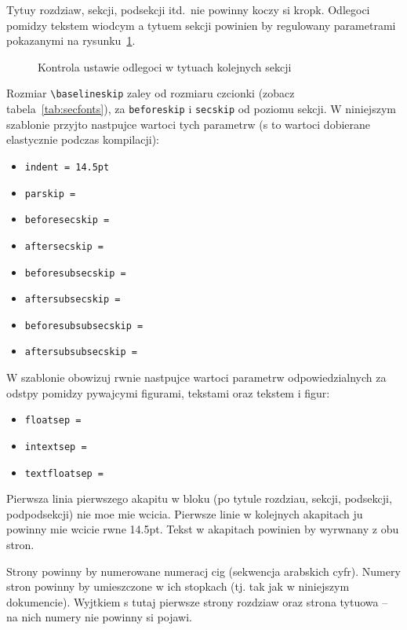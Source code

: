 Tytuy rozdziaw, sekcji, podsekcji itd.\ nie powinny koczy si kropk. Odlegoci pomidzy tekstem wiodcym a tytuem sekcji powinien by regulowany parametrami pokazanymi na rysunku~\ref{fig:LaySec}. 
\begin{figure}[t]
\runinheadfalse
\drawparameterstrue
\drawheading{\Large\bfseries}
\caption{Kontrola ustawie odlegoci w tytuach kolejnych sekcji} 
\label{fig:LaySec}
\end{figure}
Rozmiar \verb?\baselineskip? zaley od rozmiaru czcionki (zobacz tabela~\ref{tab:secfonts}), za \texttt{beforeskip} i \texttt{secskip} od poziomu sekcji. W niniejszym szablonie przyjto nastpujce wartoci tych parametrw (s to wartoci dobierane elastycznie podczas kompilacji):
\begin{itemize}
\item \texttt{indent = 14.5pt}
\item \texttt{parskip = \printlength{\parskip}}
\item \texttt{beforesecskip = \printlength{\beforesecskip}}
\item \texttt{aftersecskip = \printlength{\aftersecskip}}
\item \texttt{beforesubsecskip = \printlength{\beforesubsecskip}}
\item \texttt{aftersubsecskip = \printlength{\aftersubsecskip}}
\item \texttt{beforesubsubsecskip = \printlength{\beforesubsecskip}}
\item \texttt{aftersubsubsecskip = \printlength{\aftersubsecskip}}
\end{itemize}

W szablonie obowizuj rwnie nastpujce wartoci parametrw odpowiedzialnych za odstpy pomidzy pywajcymi figurami, tekstami oraz tekstem i figur:
\begin{itemize}
\item \texttt{floatsep = \printlength{\floatsep}}
\item \texttt{intextsep = \printlength{\intextsep}}
\item \texttt{textfloatsep = \printlength{\textfloatsep}}
\end{itemize}

Pierwsza linia pierwszego akapitu w bloku (po tytule rozdziau, sekcji, podsekcji, podpodsekcji) nie moe mie wcicia. Pierwsze linie w kolejnych akapitach ju powinny mie wcicie rwne 14.5pt. Tekst w akapitach powinien by wyrwnany z obu stron. 


Strony powinny by numerowane numeracj cig (sekwencja arabskich cyfr). Numery stron powinny by umieszczone w ich stopkach (tj. tak jak w niniejszym dokumencie). Wyjtkiem s tutaj pierwsze strony rozdziaw oraz strona tytuowa -- na nich numery nie powinny si pojawi.

